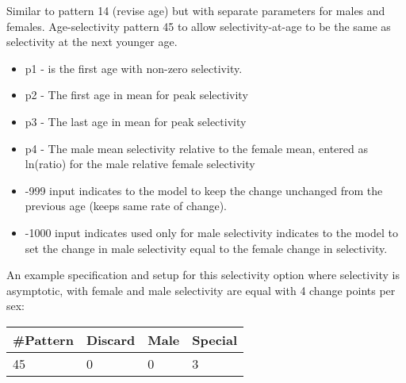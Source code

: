\hypertarget{Pattern45}{}
Similar to pattern 14 (revise age) but with separate parameters for males and females. Age-selectivity pattern 45 to allow selectivity-at-age to be the same as selectivity at the next younger age.
	\begin{itemize}
		\item p1 - is the first age with non-zero selectivity.
		\item p2 - The first age in mean for peak selectivity
		\item p3 - The last age in mean for peak selectivity
		\item p4 - The male mean selectivity relative to the female mean, entered as ln(ratio) for the male relative female selectivity
		\item -999 input indicates to the model to keep the change unchanged from the previous age (keeps same rate of change).
		\item -1000 input indicates used only for male selectivity indicates to the model to set the change in male selectivity equal to the female change in selectivity.
	\end{itemize}
		
An example specification and setup for this selectivity option where selectivity is asymptotic, with female and male selectivity are equal with 4 change points per sex:
	\begin{center}
		\begin{longtable}{p{1.5cm} p{1.5cm} p{1.5cm} p{1.5cm}}
			\hline
			\#Pattern & Discard & Male & Special \Tstrut\Bstrut\\
			\hline
			45 & 0 & 0 & 3 \Tstrut\Bstrut\\
			\hline
		\end{longtable}
	\end{center}
		

